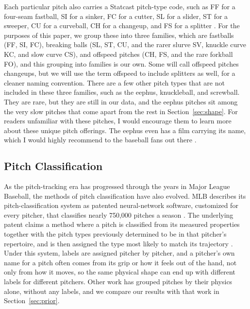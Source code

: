 \documentclass[11pt]{article}
\theoremstyle{definition}
\theoremstyle{remark}
\begin{document}
Each particular pitch also carries a Statcast pitch-type code, such as FF for a four-seam fastball, SI for a sinker, FC for a cutter, SL for a slider, ST for a sweeper, CU for a curveball, CH for a changeup, and FS for a splitter \parencite{mlbglossary_pitchtypes}.
For the purposes of this paper, we group these into three families, which are fastballs (FF, SI, FC), breaking balls (SL, ST, CU, and the rarer slurve SV, knuckle curve KC, and slow curve CS), and offspeed pitches (CH, FS, and the rare forkball FO), and this grouping into families is our own.
Some will call offspeed pitches changeups, but we will use the term offspeed to include splitters as well, for a cleaner naming convention.
There are a few other pitch types that are not included in these three families, such as the eephus, knuckleball, and screwball. They are rare, but they are still in our data, and the eephus pitches sit among the very slow pitches that come apart from the rest in Section~\ref{sec:shape}.
For readers unfamiliar with these pitches, I would encourage them to learn more about these unique pitch offerings. The eephus even has a film carrying its name, which I would highly recommend to the baseball fans out there \parencite{eephusfilm}.

\subsection{Pitch Classification}\label{sec:labels}
As the pitch-tracking era has progressed through the years in Major League Baseball, the methods of pitch classification have also evolved.
MLB describes its pitch-classification system as patented neural-network software, customized for every pitcher, that classifies nearly 750{,}000 pitches a season \parencite{sharpe2020classification}.
The underlying patent claims a method where a pitch is classified from its measured properties together with the pitch types previously determined to be in that pitcher's repertoire, and is then assigned the type most likely to match its trajectory \parencite{paul2014patent}.
Under this system, labels are assigned pitcher by pitcher, and a pitcher's own name for a pitch often comes from its grip or how it feels out of the hand, not only from how it moves, so the same physical shape can end up with different labels for different pitchers.
Other work has grouped pitches by their physics alone, without any labels, and we compare our results with that work in Section~\ref{sec:prior}.
\end{document}
